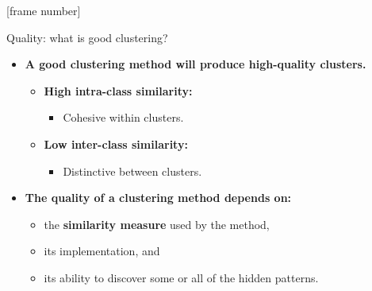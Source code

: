 \documentclass[aspectratio=169,t,xcolor=dvipsnames]{beamer}
\begin{document}
  {
    [frame number]
    \begin{frame}{Quality: what is good clustering?}
        \begin{itemize}
          \item \textbf{A good clustering method will produce high-quality clusters.}
          \begin{itemize}
            \item \textbf{\color{airforceblue}High intra-class similarity:}
            \begin{itemize}
              \item Cohesive within clusters.
            \end{itemize}
            \item \textbf{\color{airforceblue}Low inter-class similarity:}
            \begin{itemize}
              \item Distinctive between clusters.
            \end{itemize}
          \end{itemize}
          \item \textbf{The {\color{airforceblue}quality} of a clustering method depends on:}
          \begin{itemize}
            \item the \textbf{\color{airforceblue}similarity measure} used by the method,
            \item its implementation, and
            \item its ability to discover some or all of the hidden patterns.
          \end{itemize}
        \end{itemize}
    \end{frame}
  }
\end{document}
